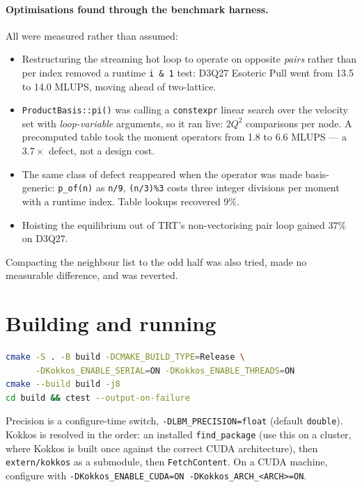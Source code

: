 \documentclass[11pt,a4paper]{article}
\newcommand{\code}[1]{\texttt{\small #1}}
\begin{document}
\paragraph{Optimisations found through the benchmark harness.} All were measured
rather than assumed:
\begin{itemize}[leftmargin=1.4em,itemsep=2pt]
\item Restructuring the streaming hot loop to operate on opposite \emph{pairs}
  rather than per index removed a runtime \code{i \& 1} test: D3Q27 Esoteric Pull
  went from 13.5 to 14.0 MLUPS, moving ahead of two-lattice.
\item \code{ProductBasis::pi()} was calling a \code{constexpr} linear search over
  the velocity set with \emph{loop-variable} arguments, so it ran live: $2Q^2$
  comparisons per node. A precomputed table took the moment operators from 1.8 to
  6.6 MLUPS --- a $3.7\times$ defect, not a design cost.
\item The same class of defect reappeared when the operator was made
  basis-generic: \code{p\_of(n)} as \code{n/9}, \code{(n/3)\%3} costs three
  integer divisions per moment with a runtime index. Table lookups recovered $9\%$.
\item Hoisting the equilibrium out of TRT's non-vectorising pair loop gained $37\%$
  on D3Q27.
\end{itemize}
Compacting the neighbour list to the odd half was also tried, made no measurable
difference, and was reverted.

\section{Building and running}

\begin{lstlisting}[language=bash]
cmake -S . -B build -DCMAKE_BUILD_TYPE=Release \
      -DKokkos_ENABLE_SERIAL=ON -DKokkos_ENABLE_THREADS=ON
cmake --build build -j8
cd build && ctest --output-on-failure
\end{lstlisting}

\noindent Precision is a configure-time switch, \code{-DLBM\_PRECISION=float}
(default \code{double}). Kokkos is resolved in the order: an installed
\code{find\_package} (use this on a cluster, where Kokkos is built once against
the correct CUDA architecture), then \code{extern/kokkos} as a submodule, then
\code{FetchContent}. On a CUDA machine, configure with
\code{-DKokkos\_ENABLE\_CUDA=ON -DKokkos\_ARCH\_<ARCH>=ON}.
\end{document}
